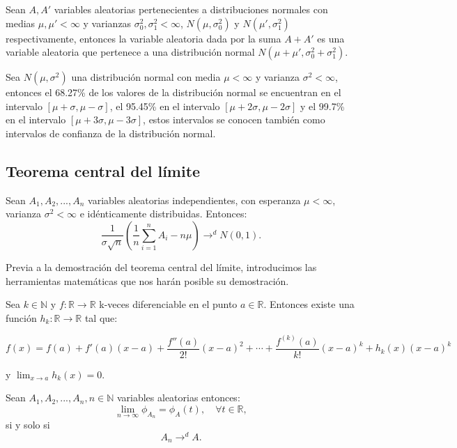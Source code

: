 \documentclass[../proyecto.tex]{memoir}
\begin{document}
\begin{prop} 
Sean $A, A'$ variables aleatorias pertenecientes a distribuciones normales con medias $\mu,\mu' < \infty$ y varianzas $\sigma_{0}^2,\sigma_{1}^{2} < \infty$, $N(\mu,\sigma_{0}^{2})$ y $N(\mu',\sigma_{1}^{2})$ respectivamente, entonces la variable aleatoria dada por la suma $A+A'$ es una variable aleatoria que pertenece a una distribución normal $N(\mu + \mu', \sigma_{0}^{2}+\sigma_{1}^{2} )$.
\end{prop}

\begin{prop} \label{prop_normal}
Sea $N(\mu,\sigma^2)$ una distribución normal con media $\mu<\infty$ y varianza $\sigma^2<\infty$, entonces el 68.27\% de los valores de la distribución normal se encuentran en el intervalo $[\mu+\sigma, \mu-\sigma]$, el 95.45\% en el intervalo $[\mu+2\sigma, \mu-2\sigma]$ y el 99.7\% en el intervalo $[\mu+3\sigma, \mu-3\sigma]$, estos intervalos se conocen también como intervalos de confianza de la distribución normal.
\end{prop}

\subsection{Teorema central del límite}

\begin{teorema} \label{central}
Sean $A_{1},A_{2},...,A_{n}$ variables aleatorias independientes, con esperanza $\mu < \infty$, varianza $\sigma^2 < \infty$ e idénticamente distribuidas. Entonces: $$
\frac{1}{ \sigma \sqrt{n}} \left( \frac{1}{n}\sum_{i=1}^nA_i - n\mu \right) \to^d N(0,1).
$$
\end{teorema}

Previa a la demostración del teorema central del límite, introducimos las herramientas matemáticas que nos harán posible su demostración.

\begin{teorema}

Sea $k \in \mathds{N}$ y $f: \mathds{R} \to \mathds{R}$ k-veces diferenciable en el punto $a \in \mathds{R}$. Entonces existe una función $h_k: \mathds{R} \to \mathds{R}$ tal que:

$$
f(x)=f(a)+f'(a)(x-a)+\frac{f''(a)}{2!}(x-a)^2+\dotsb+\frac{f^{(k)}(a)}{k!}(x-a)^k + h_k(x)(x-a)^k
$$

y $\lim_{x\to a} h_k(x) = 0$.
\end{teorema}

\begin{teorema} \label{cont}
Sean $A_1, A_2,...,A_n, n\in\mathds{N}$ variables aleatorias entonces: $$
\lim_{n \to \infty }{\phi_{A_n}} = \phi_{A}(t), \quad \forall t\in \mathds{R},
$$
si y solo si $$
A_n \to^d A.
$$

\end{teorema}
\end{document}
